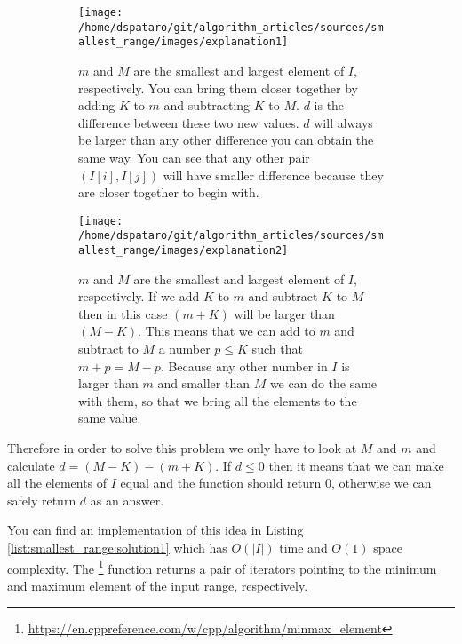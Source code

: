 \begin{figure}
	\vspace*{-0.5in}
	\centering
	\begin{subfigure}[t]{0.90\textwidth}
		\texttt{[image: /home/dspataro/git/algorithm\_articles/sources/smallest\_range/images/explanation1]} 
		\caption{$m$ and $M$ are the smallest and largest element of $I$, respectively. You can
		bring them closer together by adding $K$ to $m$ and subtracting $K$ to $M$. $d$ is the
		difference between these two new values. $d$ will always be larger than any other difference
		you can obtain the same way. You can see that any other pair $(I[i], I[j])$ will have
		smaller difference because they are closer together to begin with.}
		\label{fig:smallest_range:explanation1} 
	 \end{subfigure}
	\medskip
	\begin{subfigure}[t]{0.90\textwidth}
		\texttt{[image: /home/dspataro/git/algorithm\_articles/sources/smallest\_range/images/explanation2]} 
		\caption{$m$ and $M$ are the smallest and largest element of $I$, respectively. If we  add
		$K$ to $m$ and subtract $K$ to $M$ then in this case $(m+K)$ will be larger than $(M-K)$.
		This means that we can add to $m$ and subtract to $M$ a number $p \leq K$ such that $m+p =
		M-p$. Because any other number in $I$ is larger than $m$ and smaller than $M$ we can do the
		same with them, so that we bring all the elements to the same value.}
		\label{fig:smallest_range:explanation2} 
	 \end{subfigure}
	 \medskip
	 \label{}
	 \caption{}
\end{figure}
Therefore in order to solve this problem we only have to look at $M$ and $m$ and calculate
$d=(M-K)-(m+K)$. If $d \leq 0$ then it means that we can make all the elements of $I$ equal and the
function should return $0$, otherwise we can safely return $d$ as an answer.

You can find an implementation of this idea in Listing \ref{list:smallest_range:solution1} which has
$O(|I|)$ time and $O(1)$ space complexity. The
\footnote{\url{https://en.cppreference.com/w/cpp/algorithm/minmax_element}}
function  returns a pair of iterators pointing to the minimum and maximum element of the input
range, respectively.



